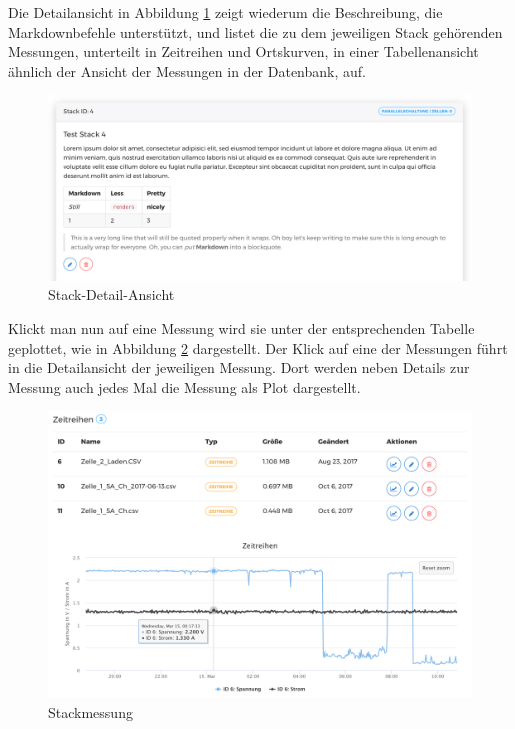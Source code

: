 Die Detailansicht in Abbildung \ref{fig:stack} zeigt wiederum die Beschreibung, die Markdownbefehle unterstützt, und listet die zu dem jeweiligen Stack gehörenden Messungen, unterteilt in Zeitreihen und Ortskurven, in einer Tabellenansicht ähnlich der Ansicht der Messungen in der Datenbank, auf.

\begin{figure}
\centering
\includegraphics[width=\textwidth]{Figures/stack}
\caption{Stack-Detail-Ansicht}
\label{fig:stack}
\end{figure}

Klickt man nun auf eine Messung wird sie unter der entsprechenden Tabelle geplottet, wie in Abbildung \ref{fig:stackmessung} dargestellt. Der Klick auf eine der Messungen führt in die Detailansicht der jeweiligen Messung. Dort werden neben Details zur Messung auch jedes Mal die Messung als Plot dargestellt.

\begin{figure}
\centering
\includegraphics[width=\textwidth]{Figures/stackmessung}
\caption{Stackmessung}
\label{fig:stackmessung}
\end{figure}


